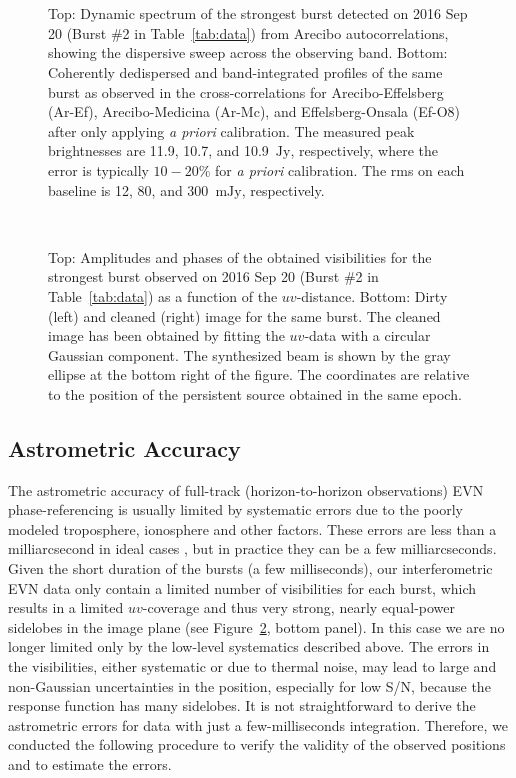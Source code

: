 \documentclass[twocolumn]{aastex61}
\begin{document}
\begin{figure}[ht!]
	\\[+10pt]
	\\
    	\caption{Top: Dynamic spectrum of the strongest burst detected on 2016 Sep 20 (Burst \#2 in Table~\ref{tab:data}) from Arecibo autocorrelations, showing the dispersive sweep across the observing band.  Bottom: Coherently dedispersed and band-integrated profiles of the same burst as observed in the cross-correlations for Arecibo-Effelsberg (Ar-Ef), Arecibo-Medicina (Ar-Mc), and Effelsberg-Onsala (Ef-O8) after only applying {\it a priori} calibration. The measured peak brightnesses are 11.9, 10.7, and 10.9~$\mathrm{Jy}$, respectively, where the error is typically $10-20$\% for {\it a priori} calibration.  The rms on each baseline is 12, 80, and 300~$\mathrm{mJy}$, respectively.
	\label{fig:pulse_det1}}
\end{figure}

\begin{figure}[t!]
	\\
    	\caption{Top: Amplitudes and phases of the obtained visibilities for the strongest burst observed on 2016 Sep 20 (Burst \#2 in Table~\ref{tab:data}) as a function of the $uv$-distance.
	Bottom: Dirty (left) and cleaned (right) image for the same burst. The cleaned image has been obtained by fitting the $uv$-data with a circular Gaussian component. The synthesized beam is shown by the gray ellipse at the bottom right of the figure. The coordinates are relative to the position of the persistent source obtained in the same epoch.
	\label{fig:pulse_det2}}
\end{figure}

\subsection{Astrometric Accuracy}
\label{sec:astrometry}

The astrometric accuracy of full-track (horizon-to-horizon observations) EVN phase-referencing is usually limited by systematic errors due to the poorly modeled troposphere, ionosphere and other factors. These errors are less than a milliarcsecond in ideal cases \citep{pradel2006}, but in practice they can be a few milliarcseconds. Given the short duration of the bursts (a few milliseconds), our interferometric EVN data only contain a limited number of visibilities for each burst, which results in a limited $uv$-coverage and thus very strong, nearly equal-power sidelobes in the image plane (see Figure~\ref{fig:pulse_det2}, bottom panel).  In this case we are no longer limited only by the low-level systematics described above. The errors in the visibilities, either systematic or due to thermal noise, may lead to large and non-Gaussian uncertainties in the position, especially for low S/N, because the response function has many sidelobes. It is not straightforward to derive the astrometric errors for data with just a few-milliseconds integration.  Therefore, we conducted the following procedure to verify the validity of the observed positions and to estimate the errors.
\end{document}
